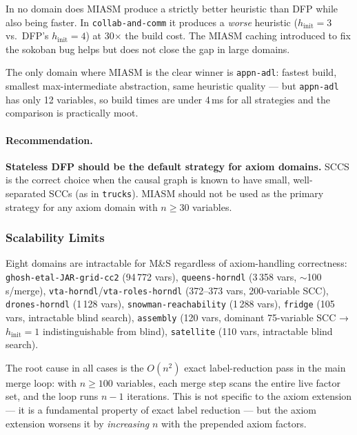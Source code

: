 \documentclass[11pt,a4paper]{article}
\begin{document}
In no domain does MIASM produce a strictly better heuristic than DFP while
also being faster.  In \texttt{collab-and-comm} it produces a \emph{worse}
heuristic ($h_{\mathrm{init}} = 3$ vs.\ DFP's $h_{\mathrm{init}} = 4$) at
30$\times$ the build cost.  The MIASM caching introduced to fix the sokoban bug
helps but does not close the gap in large domains.

The only domain where MIASM is the clear winner is \texttt{appn-adl}: fastest
build, smallest max-intermediate abstraction, same heuristic quality --- but
\texttt{appn-adl} has only 12 variables, so build times are under 4\,ms for
all strategies and the comparison is practically moot.

\paragraph{Recommendation.} \textbf{Stateless DFP should be the default
strategy for axiom domains.}  SCCS is the correct choice when the causal graph
is known to have small, well-separated SCCs (as in \texttt{trucks}).  MIASM
should not be used as the primary strategy for any axiom domain with
$n \geq 30$ variables.

\subsubsection{Scalability Limits}

Eight domains are intractable for M\&S regardless of axiom-handling
correctness: \texttt{ghosh-etal-JAR-grid-cc2} (94\,772 vars),
\texttt{queens-horndl} (3\,358 vars, $\sim$100\,s/merge),
\texttt{vta-horndl}/\texttt{vta-roles-horndl} (372--373 vars, 200-variable SCC),
\texttt{drones-horndl} (1\,128 vars),
\texttt{snowman-reachability} (1\,288 vars),
\texttt{fridge} (105 vars, intractable blind search),
\texttt{assembly} (120 vars, dominant 75-variable SCC → $h_{\mathrm{init}}=1$
indistinguishable from blind),
\texttt{satellite} (110 vars, intractable blind search).

The root cause in all cases is the $O(n^2)$ exact label-reduction pass in the
main merge loop: with $n\geq 100$ variables, each merge step scans the entire
live factor set, and the loop runs $n-1$ iterations.  This is not specific to
the axiom extension --- it is a fundamental property of exact label reduction
--- but the axiom extension worsens it by \emph{increasing} $n$ with the
prepended axiom factors.
\end{document}
